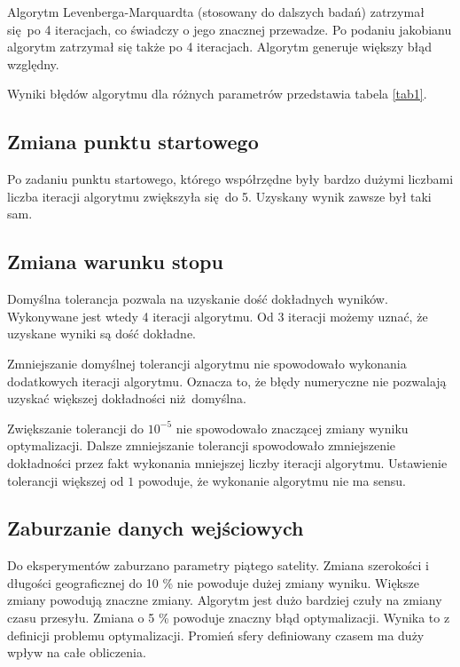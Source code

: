 \documentclass[]{article}
\begin{document}
Algorytm Levenberga-Marquardta (stosowany do dalszych badań) zatrzymał się po 4 iteracjach, co świadczy o jego znacznej przewadze. Po podaniu jakobianu
algorytm zatrzymał się także po 4 iteracjach. Algorytm generuje większy błąd względny.

Wyniki błędów algorytmu dla różnych parametrów przedstawia tabela \ref{tab1}.

\subsection{Zmiana punktu startowego}
Po zadaniu punktu startowego, którego współrzędne były bardzo dużymi liczbami liczba iteracji algorytmu zwiększyła się do 5. Uzyskany wynik zawsze był taki sam.
\subsection{Zmiana warunku stopu}
Domyślna tolerancja pozwala na uzyskanie dość dokładnych wyników. Wykonywane jest wtedy 4 iteracji algorytmu. Od 3 iteracji możemy uznać, że uzyskane wyniki są dość dokładne.

Zmniejszanie domyślnej tolerancji algorytmu nie spowodowało wykonania dodatkowych iteracji algorytmu. Oznacza to, że błędy numeryczne nie pozwalają uzyskać większej dokładności niż domyślna.

Zwiększanie tolerancji do $10^{-5}$ nie spowodowało znaczącej zmiany wyniku optymalizacji. Dalsze zmniejszanie tolerancji spowodowało zmniejszenie dokładności przez fakt wykonania mniejszej liczby iteracji algorytmu. Ustawienie tolerancji większej od $1$ powoduje, że wykonanie algorytmu nie ma sensu.

\subsection{Zaburzanie danych wejściowych}
Do eksperymentów zaburzano parametry piątego satelity. Zmiana szerokości i długości geograficznej do 10 \% nie powoduje dużej zmiany wyniku. Większe zmiany powodują znaczne zmiany. Algorytm jest dużo bardziej czuły na zmiany czasu przesyłu. Zmiana o 5 \% powoduje znaczny błąd optymalizacji. Wynika to z definicji problemu optymalizacji. Promień sfery definiowany czasem ma duży wpływ na całe obliczenia.
\end{document}
